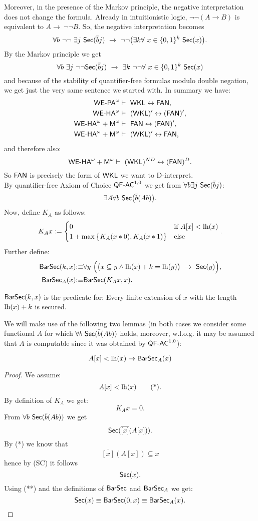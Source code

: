 Moreover, in the presence of the Markov principle,
 the negative interpretation does not change the formula. 
Already in intuitionistic logic,
$\neg\neg (A\rightarrow B)$ is equivalent to $A\rightarrow\ \neg\neg B$.
So, the negative interpretation becomes
\[
\forall b\ \neg\neg\ \exists j\ \Sec(\bar b j) \ 
       \rightarrow \ \neg\neg\big(\exists k \forall\ x\in\{0,1\}^k\ \Sec(x)\big) 
\text{.}\]
By the Markov principle we get
\[
\forall b\ \exists j\ \neg\neg \Sec(\bar b j) \ 
       \rightarrow \ \exists k\ \neg\neg\forall\ x\in\{0,1\}^k\ \Sec(x)
\]
and because of the stability of quantifier-free formulas modulo double negation, 
we get just the very same sentence we started with. 
In summary we have:
\begin{align*}
{\textsf{\upshape WE-PA}}^{\omega} &\vdash\ \textsf{\upshape WKL}\leftrightarrow\textsf{\upshape FAN} \text{,}\\
{\textsf{\upshape WE-HA}}^{\omega} &\vdash\ (\textsf{\upshape WKL})'\leftrightarrow(\textsf{\upshape FAN})' \text{,}\\
{\textsf{\upshape WE-HA}}^{\omega}+\textsf{\upshape M}^\omega &\vdash\ \textsf{\upshape FAN}\leftrightarrow(\textsf{\upshape FAN})' \text{,}\\
{\textsf{\upshape WE-HA}}^{\omega}+\textsf{\upshape M}^\omega &\vdash\ (\textsf{\upshape WKL})'\leftrightarrow\textsf{\upshape FAN} \text{,}\\
\end{align*}
and therefore also:
\[
\weha+\M \proves\ (\WKL)^{ND}\leftrightarrow(\FAN)^D \text{.}\\
\]
So $\textsf{\upshape FAN}$ is precisely the form of $\textsf{\upshape WKL}$ we want to D-interpret.\\ 
By quantifier-free Axiom of Choice $\textsf{\upshape QF-}\textsf{\upshape AC}^{1,0}$ we get 
from $\forall b \exists j\ \textsf{\upshape Sec}(\bar b j)$:
\[ \exists A \forall b \ \textsf{\upshape Sec}\big(\bar b(Ab)\big) \text{.}\]
Now, define $K_A$ as follows:
\[
K_Ax:= \begin{cases} 0&\text{if}\ A[x]<\operatorname{lh}(x)\\ 1+\max\big\{K_{A}( x *0),K_A( x *1)\big\}&\text{else} \end{cases} 
\text{.}
\]
Further define:
\begin{align*}
\BSec(k,x) &{:\equiv}
\forall y\ \Big(\big(x\subseteq y \wedge \lh(x)+k=\lh(y)\big)\ \rightarrow\ \Sec(y)\Big) \text{,}\\
\BSecA(x) &{:\equiv} \BSec(K_Ax,x) \text{.}
\end{align*}
\begin{rmk} $\textsf{\upshape BarSec}(k,x)$ is the predicate for: Every finite extension of $x$ with the length $\operatorname{lh}(x)+k$ 
is secured.\end{rmk}
We will make use of the following two lemmas (in both cases we consider some functional $A$ 
for which $\forall b \ \textsf{\upshape Sec}(\bar b(Ab))$ holds, moreover, w.l.o.g. it may be assumed that $A$
is computable since it was obtained by $\textsf{\upshape QF}\textsf{\upshape -}\textsf{\upshape AC}^{1,0}$):
\begin{lemma}
\label{l:L1}
\[ A[x] < \operatorname{lh}(x) \rightarrow \textsf{\upshape BarSec}_A(x) \]
\end{lemma}
\begin{proof}
We assume:
\[ A[x] < \operatorname{lh}(x) \tag{*} \text{.}\]
By definition of $K_A$ we get:
\[ K_Ax=0  \tag{**} \text{.}\] 
From $\forall b \ \textsf{\upshape Sec}(\bar b(Ab))$ we get
\[ \textsf{\upshape Sec}(\overline{[x]}(A[x]))\text{.}\]
By (*) we know that
\[
\overline{[x]}(A[x])\subseteq x
\] hence by (SC) it follows
\[ \textsf{\upshape Sec}(x) \text{.}\]
Using (**) and the definitions of $\textsf{\upshape BarSec}$ and $\textsf{\upshape BarSec}_A$ we get:
\[ \textsf{\upshape Sec}(x) \equiv \textsf{\upshape BarSec}(0,x) \equiv \textsf{\upshape BarSec}_A(x) \text{.}\]
\end{proof}

